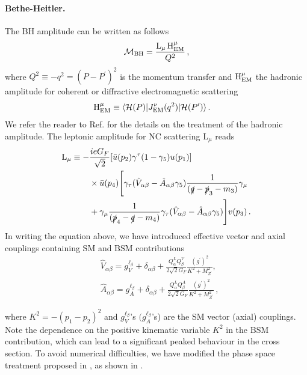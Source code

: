\paragraph{Bethe-Heitler.} The BH amplitude can be written as follows 
%
\begin{equation}
\mathcal{M}_{\rm BH} = \frac{\mathrm{L}_\mu \,\mathrm{H}_{\rm EM}^{\mu}}{Q^2}\, ,
\end{equation}
%
where $Q^2 \equiv -q^2 = (P - P^\prime)^2$ is the momentum transfer and $\mathrm{H}_{\rm EM}^{\mu}$ the hadronic amplitude for coherent or diffractive electromagnetic scattering
%
\begin{align}
{\rm H}^\mu_{\rm EM} &\equiv \langle {\cal H}(P) \vert J_\mathrm{EM}^\nu (q^2)\vert {\cal H}(P^\prime)\rangle\,.
\label{eq:Hmu1}
\end{align}
%
We refer the reader to Ref. \cite{Ballett:2018uuc} for the details on the treatment of the hadronic amplitude. %
The leptonic amplitude for NC scattering $\mathrm{L}_\mu$ reads
%
\begin{align}
\mathrm{L}_\mu  \equiv - &\frac{ie G_F}{\sqrt{2}}[\bar{u}(p_2)\gamma^\tau(1-\gamma_5)u(p_1)] \nonumber\\
&\times 
\bar{u}(p_4)\Bigg[\gamma_\tau(\hat{V}_{\alpha\beta}-\hat{A}_{\alpha\beta}\gamma_5)\frac{1}{(\slashed{q}-\slashed{p}_3-m_3)}\gamma_\mu \nonumber \\ 
& + \gamma_\mu \frac{1}{(\slashed{p}_4-\slashed{q}-m_4)} \gamma_\tau (\hat{V}_{\alpha\beta}-\hat{A}_{\alpha\beta}\gamma_5) \Bigg] v(p_3)\,.
\label{eq:Lmu1}
\end{align}
%
In writing the equation above, we have introduced effective vector and axial couplings containing SM and BSM contributions
\begin{subequations}
\begin{align}
&\hat{V}_{\alpha \beta} = g^{\ell_{\beta}}_{V} + \delta_{\alpha \beta} +  \frac{Q_{\alpha}^L Q_{\beta}^V}{2\sqrt{2} G_{F}} \frac{(g^\prime)^2}{K^2 + M^2_{Z^\prime}},
\\&  
\hat{A}_{\alpha \beta} = g^{\ell_{\beta}}_{A} + \delta_{\alpha \beta} + \frac{Q_{\alpha}^L Q_{\beta}^A}{2\sqrt{2} G_{F}} \frac{(g^\prime)^2}{K^2 + M^2_{Z^\prime}}\,,
\label{eq:c_prescription_trident}
\end{align}
\end{subequations}

where $K^2 = -(p_1-p_2)^2$ and $g^{\ell_{\beta}}_{V}$'s $(g^{\ell_{\beta}}_{A}$'s) are the SM vector (axial) couplings. Note the dependence on the positive kinematic variable $K^2$ in the BSM contribution, which can lead to a significant peaked behaviour in the cross section. To avoid numerical difficulties, we have modified the phase space treatment proposed in \cite{Czyz1964,Lovseth1971}, as shown in . 


